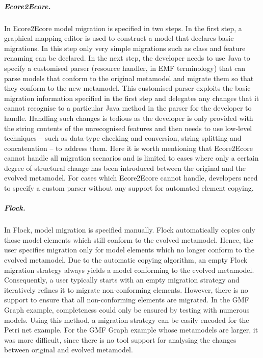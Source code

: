 \subparagraph{Ecore2Ecore.} In Ecore2Ecore model migration is specified in two steps. In the first step, a graphical mapping editor is used to construct a model that declares basic migrations. In this step only very simple migrations such as class and feature renaming can be declared. In the next step, the developer needs to use Java to specify a customised parser (resource handler, in EMF terminology) that can parse models that conform to the original metamodel and migrate them so that they conform to the new metamodel. This customised parser exploits the basic migration information specified in the first step and delegates any changes that it cannot recognise to a particular Java method in the parser for the developer to handle. Handling such changes is tedious as the developer is only provided with the string contents of the unrecognised features and then needs to use low-level techniques -- such as data-type checking and conversion, string splitting and concatenation -- to address them. Here it is worth mentioning that Ecore2Ecore cannot handle all migration scenarios and is limited to cases where only a certain degree of structural change has been introduced between the original and the evolved metamodel. For cases which Ecore2Ecore cannot handle, developers need to specify a custom parser without any support for automated element copying.

\subparagraph{Flock.} In Flock, model migration is specified manually. Flock automatically copies only those model elements which still conform to the evolved metamodel. Hence, the user specifies migration only for model elements which no longer conform to the evolved metamodel.
%
Due to the automatic copying algorithm, an empty Flock migration strategy always yields a model conforming to the evolved metamodel. Consequently, a user typically starts with an empty migration strategy and iteratively refines it to migrate non-conforming elements. However, there is no support to ensure that all non-conforming elements are migrated. In the GMF Graph example, completeness could only be ensured by testing with numerous models.
%
Using this method, a migration strategy can be easily encoded for the Petri net example. For the GMF Graph example whose metamodels are larger, it was more difficult, since there is no tool support for analysing the changes between original and evolved metamodel. %

